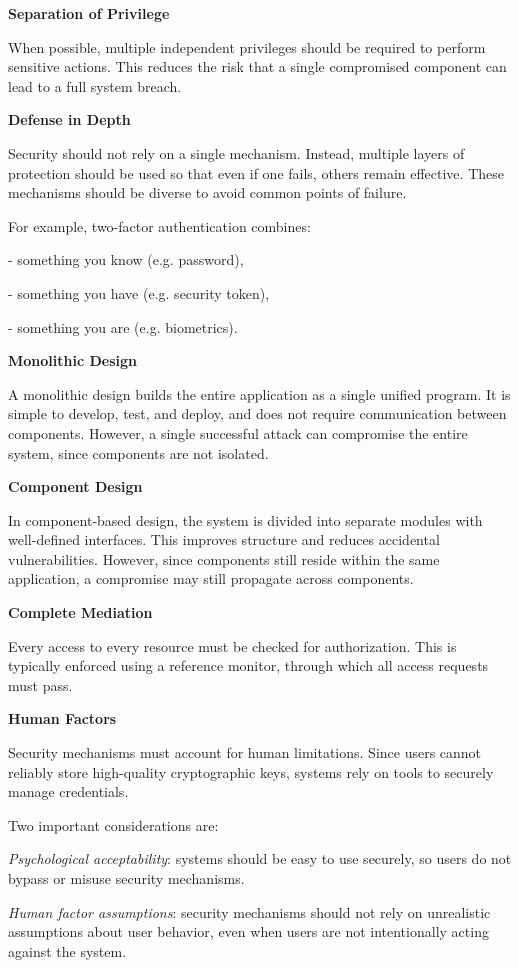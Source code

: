 \textbf{Separation of Privilege} 

When possible, multiple independent privileges should be required to perform sensitive actions. This reduces the risk that a single compromised component can lead to a full system breach.

\textbf{Defense in Depth} 

Security should not rely on a single mechanism. Instead, multiple layers of protection should be used so that even if one fails, others remain effective. These mechanisms should be diverse to avoid common points of failure.

For example, two-factor authentication combines:

- something you know (e.g. password),

- something you have (e.g. security token),

- something you are (e.g. biometrics).

\textbf{Monolithic Design} 

A monolithic design builds the entire application as a single unified program. It is simple to develop, test, and deploy, and does not require communication between components. However, a single successful attack can compromise the entire system, since components are not isolated.

\textbf{Component Design} 

In component-based design, the system is divided into separate modules with well-defined interfaces. This improves structure and reduces accidental vulnerabilities. However, since components still reside within the same application, a compromise may still propagate across components.

\textbf{Complete Mediation} 

Every access to every resource must be checked for authorization. This is typically enforced using a reference monitor, through which all access requests must pass.

\textbf{Human Factors} 

Security mechanisms must account for human limitations. Since users cannot reliably store high-quality cryptographic keys, systems rely on tools to securely manage credentials.

Two important considerations are:

\textit{Psychological acceptability}: systems should be easy to use securely, so users do not bypass or misuse security mechanisms.

\textit{Human factor assumptions}: security mechanisms should not rely on unrealistic assumptions about user behavior, even when users are not intentionally acting against the system.